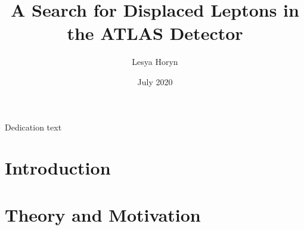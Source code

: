 \documentclass{ucetd}
\title{A Search for Displaced Leptons in the ATLAS Detector}
\author{Lesya Horyn}
\date{July 2020}
\begin{document}
\maketitle

\makecopyright

\clearpage
\begin{center}
    \thispagestyle{empty}
    \vspace*{\fill}
    Dedication text

    \vspace*{\fill}
\end{center}
\clearpage




\tableofcontents
\listoffigures
\listoftables



\acknowledgments

\abstract

\mainmatter



\part{Introduction}


\cleardoublepage

\part{Theory and Motivation}



\cleardoublepage 

\end{document}
